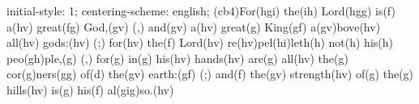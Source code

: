 initial-style: 1;
centering-scheme: english;
(cb4)For(hgi) the(ih) Lord(hgg) is(f) a(hv) great(fg) God,(gv) (,) and(gv) a(hv) great(g) King(gf) a(gv)bove(hv) all(hv) gods:(hv) (;) for(hv) the(f) Lord(hv) re(hv)pel(hi)leth(h) not(h) his(h) peo(gh)ple,(g) (,) for(g) in(g) his(hv) hands(hv) are(g) all(hv) the(g) cor(g)ners(gg) of(d) the(gv) earth:(gf) (;) and(f) the(gv) strength(hv) of(g) the(g) hills(hv) is(g) his(f) al(gig)so.(hv)
